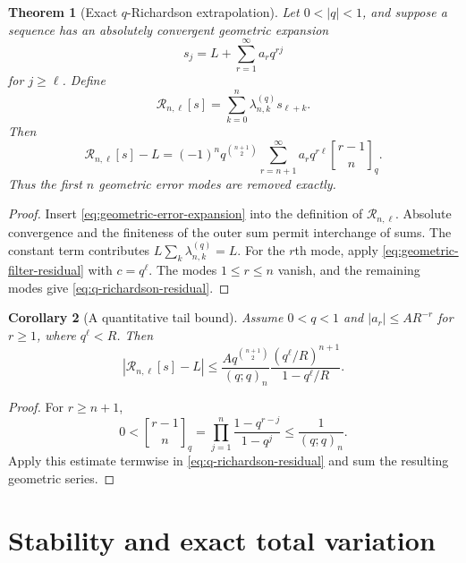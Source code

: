 \documentclass[11pt,oneside,openany]{book}
\newtheorem{theorem}{Theorem}[chapter]
\newtheorem{corollary}[theorem]{Corollary}
\theoremstyle{definition}
\theoremstyle{remark}
\newcommand{\Qbinom}[3]{\genfrac{[}{]}{0pt}{}{#1}{#2}_{#3}}
\begin{document}
\begin{theorem}[Exact $q$-Richardson extrapolation]\label{thm:q-richardson}
Let $0<|q|<1$, and suppose a sequence has an absolutely convergent geometric expansion
\begin{equation}
 s_j=L+\sum_{r=1}^{\infty}a_rq^{rj}\label{eq:geometric-error-expansion}
\end{equation}
for $j\ge\ell$.  Define
\[
 \mathcal R_{n,\ell}[s]
 =\sum_{k=0}^n\lambda_{n,k}^{(q)}s_{\ell+k}.
\]
Then
\begin{equation}
 \mathcal R_{n,\ell}[s]-L
 =(-1)^nq^{\binom{n+1}{2}}
 \sum_{r=n+1}^{\infty}a_rq^{r\ell}\Qbinom{r-1}nq.\label{eq:q-richardson-residual}
\end{equation}
Thus the first $n$ geometric error modes are removed exactly.
\end{theorem}

\begin{proof}
Insert \eqref{eq:geometric-error-expansion} into the definition of $\mathcal R_{n,\ell}$.  Absolute convergence and the finiteness of the outer sum permit interchange of sums.  The constant term contributes $L\sum_k\lambda_{n,k}^{(q)}=L$.  For the $r$th mode, apply \eqref{eq:geometric-filter-residual} with $c=q^\ell$.  The modes $1\le r\le n$ vanish, and the remaining modes give \eqref{eq:q-richardson-residual}.
\end{proof}

\begin{corollary}[A quantitative tail bound]\label{cor:q-richardson-bound}
Assume $0<q<1$ and $|a_r|\le AR^{-r}$ for $r\ge1$, where $q^\ell<R$.  Then
\begin{equation}
 \left|\mathcal R_{n,\ell}[s]-L\right|
 \le
 \frac{Aq^{\binom{n+1}{2}}}{(q;q)_n}
 \frac{(q^\ell/R)^{n+1}}{1-q^\ell/R}.\label{eq:q-richardson-bound}
\end{equation}
\end{corollary}

\begin{proof}
For $r\ge n+1$,
\[
 0<\Qbinom{r-1}nq
 =\prod_{j=1}^n\frac{1-q^{r-j}}{1-q^j}
 \le\frac1{(q;q)_n}.
\]
Apply this estimate termwise in \eqref{eq:q-richardson-residual} and sum the resulting geometric series.
\end{proof}

\section{Stability and exact total variation}
\end{document}

